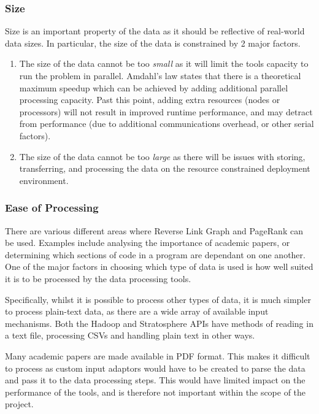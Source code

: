 \subsubsection{Size}
Size is an important property of the data as it should be reflective of real-world data sizes. In particular, the size of the data is constrained by 2 major factors.

\begin{enumerate}
	\item The size of the data cannot be too \textit{small} as it will limit the tools capacity to run the problem in parallel. Amdahl's law \cite{amdahl1967validity} states that there is a theoretical maximum speedup which can be achieved by adding additional parallel processing capacity. Past this point, adding extra resources (nodes or processors) will not result in improved runtime performance, and may detract from performance (due to additional communications overhead, or other serial factors).
	\item The size of the data cannot be too \textit{large} as there will be issues with storing, transferring, and processing the data on the resource constrained deployment environment.
\end{enumerate}

\subsubsection{Ease of Processing}
There are various different areas where Reverse Link Graph and PageRank can be used. Examples include analysing the importance of academic papers, or determining which sections of code in a program are dependant on one another. One of the major factors in choosing which type of data is used is how well suited it is to be processed by the data processing tools. 

Specifically, whilst it is possible to process other types of data, it is much simpler to process plain-text data, as there are a wide array of available input mechanisms. Both the Hadoop and Stratosphere APIs have methods of reading in a text file, processing CSVs and handling plain text in other ways. 

Many academic papers are made available in PDF format. This makes it difficult to process as custom input adaptors would have to be created to parse the data and pass it to the data processing steps. This would have limited impact on the performance of the tools, and is therefore not important within the scope of the project. 

